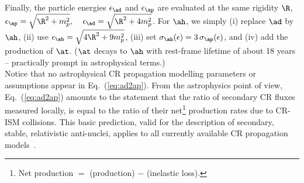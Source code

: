 % 
Finally, the particle energies $\epsilon_{\ad}$ and $\epsilon_{\ap}$ are evaluated at the same rigidity $\R$,
$\epsilon_{\ap}=\sqrt{\R^2+m_p^2},\;\;\;\;\epsilon_{\ad}=\sqrt{\R^2+4m_p^2}$.
%
For $\ah$, we simply (i) replace $\ad$ by $\ah$, (ii) use $\epsilon_{\ah}=\sqrt{4\R^2+9m_p^2}$, (iii) set $\sigma_{\ah}(\epsilon)=3\,\sigma_{\ap}(\epsilon)$, and (iv) add the production of $\at$. ($\at$ decays to $\ah$ with rest-frame lifetime of about 18 years -- practically prompt in astrophysical terms.)\\
%
Notice that no astrophysical CR propagation modelling parameters or assumptions appear in Eq.~(\ref{eq:ad2ap}). 
%
From the astrophysics point of view, Eq.~(\ref{eq:ad2ap}) amounts to the statement that the ratio of secondary CR fluxes measured locally, is equal to the ratio of their net\footnote{Net production $=$ (production) $-$ (inelastic loss).} production rates due to CR-ISM collisions. This basic prediction, valid for the description of secondary, stable, relativistic anti-nuclei, applies to all currently available CR propagation models~\cite{Ginzburg:1990sk,Katz:2009yd}. 
%


